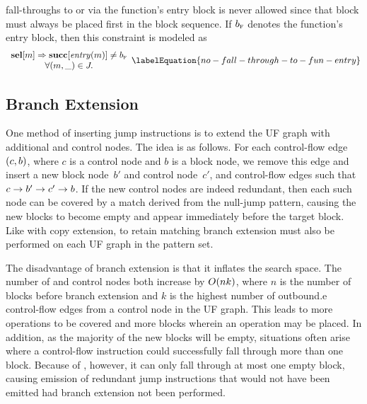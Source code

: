 \Glspl{fall-through} to or via the \gls{function}'s \gls{entry block} is never
allowed since that \gls{block} must always be placed first in the \gls{block}
sequence.
%
If $b_{\textrm{\textsc{f}}}$ denotes the \gls{function}'s \gls{entry block}, then
this \gls{constraint} is modeled as
%
\begin{equation}
  \begin{array}{c}
    \mVar{sel}[m]
    \mImp
    \mVar{succ}[\mEntry(m)] \neq \mFunctionEntryBlock \\
    \forall \mPair{m}{\_} \in \mFallThroughSet.
  \end{array}
  \labelEquation{no-fall-through-to-fun-entry}
\end{equation}


\subsection{Branch Extension}

One method of inserting jump \glspl{instruction} is to extend the \gls{UF graph}
with additional  and \glspl{control node}.
%
The idea is as follows.
%
For each \gls{control-flow edge}~$\mPair{c}{b}$, where $c$ is a \gls{control
  node} and $b$ is a \gls{block node}, we remove this \gls{edge} and insert a
new \gls{block node}~$b'$ and \gls{control node}~$c'$, and \glspl{control-flow
  edge} such that \mbox{$c \rightarrow b' \rightarrow c' \rightarrow b$}.
%
If the new \glspl{control node} are indeed redundant, then each such \gls{node}
can be covered by a \gls{match} derived from the \gls{null-jump pattern},
causing the new \glspl{block} to become empty and appear immediately before the
target \gls{block}.
%
Like with \gls{copy extension}, to retain matching \gls{branch extension} must
also be performed on each \gls{UF graph} in the \gls{pattern set}.

The disadvantage of \gls{branch extension} is that it inflates the \gls{search
  space}.
%
The number of  and \glspl{control node} both increase by
$O(nk)$, where $n$ is the number of \glspl{block} before \gls{branch
  extension} and $k$ is the highest number of \gls{outbound.e}
\glspl{control-flow edge} from a \gls{control node} in the \gls{UF graph}.
%
This leads to more \glspl{operation} to be covered and more \glspl{block}
wherein an \gls{operation} may be placed.
%
In addition, as the majority of the new \glspl{block} will be empty, situations
often arise where a control-flow \gls{instruction} could successfully fall
through more than one \gls{block}.
%
Because of , however, it can only fall through at most
one empty \gls{block}, causing emission of redundant jump \glspl{instruction}
that would not have been emitted had \gls{branch extension} not been performed.


